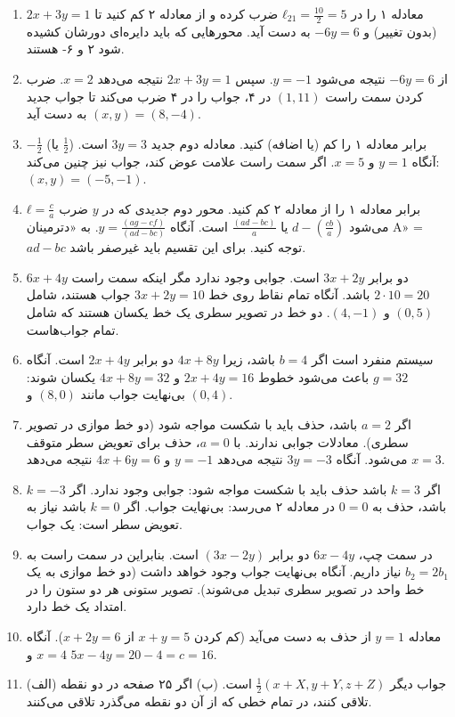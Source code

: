 \documentclass[12pt]{article}
\begin{document}
	
	\begin{enumerate}
		\item معادله ۱ را در $ℓ_{21} = \frac{10}{2} = 5$ ضرب کرده و از معادله ۲ کم کنید تا $2x+3y=1$ (بدون تغییر) و $−6y=6$ به دست آید. محورهایی که باید دایره‌ای دورشان کشیده شود ۲ و ۶- هستند.
		\item از $−6y=6$ نتیجه می‌شود $y=−1$. سپس $2x+3y=1$ نتیجه می‌دهد $x=2$. ضرب کردن سمت راست $(1,11)$ در ۴، جواب را در ۴ ضرب می‌کند تا جواب جدید $(x,y)=(8,−4)$ به دست آید.
		\item $-\frac{1}{2}$ (یا $\frac{1}{2}$) برابر معادله ۱ را کم (یا اضافه) کنید. معادله دوم جدید $3y=3$ است. آنگاه $y=1$ و $x=5$. اگر سمت راست علامت عوض کند، جواب نیز چنین می‌کند: $(x,y)=(−5,−1)$.
		\item $ℓ=\frac{c}{a}$ برابر معادله ۱ را از معادله ۲ کم کنید. محور دوم جدیدی که در $y$ ضرب می‌شود $d−(\frac{cb}{a})$ یا $\frac{(ad−bc)}{a}$ است. آنگاه $y=\frac{(ag−cf)}{(ad−bc)}$. به «دترمینان A» = $ad−bc$ توجه کنید. برای این تقسیم باید غیرصفر باشد.
		\item $6x+4y$ دو برابر $3x+2y$ است. جوابی وجود ندارد مگر اینکه سمت راست $2 \cdot 10 = 20$ باشد. آنگاه تمام نقاط روی خط $3x+2y = 10$ جواب هستند، شامل $(0,5)$ و $(4,−1)$. دو خط در تصویر سطری یک خط یکسان هستند که شامل تمام جواب‌هاست.
		\item سیستم منفرد است اگر $b = 4$ باشد، زیرا $4x + 8y$ دو برابر $2x+4y$ است. آنگاه $g = 32$ باعث می‌شود خطوط $2x+4y=16$ و $4x+8y=32$ یکسان شوند: بی‌نهایت جواب مانند $(8,0)$ و $(0,4)$.
		\item اگر $a = 2$ باشد، حذف باید با شکست مواجه شود (دو خط موازی در تصویر سطری). معادلات جوابی ندارند. با $a = 0$، حذف برای تعویض سطر متوقف می‌شود. آنگاه $3y = −3$ نتیجه می‌دهد $y = −1$ و $4x+6y = 6$ نتیجه می‌دهد $x = 3$.
		\item اگر $k = 3$ باشد حذف باید با شکست مواجه شود: جوابی وجود ندارد. اگر $k = −3$ باشد، حذف به $0 = 0$ در معادله ۲ می‌رسد: بی‌نهایت جواب. اگر $k = 0$ باشد نیاز به تعویض سطر است: یک جواب.
		\item در سمت چپ، $6x−4y$ دو برابر $(3x−2y)$ است. بنابراین در سمت راست به $b_2 = 2b_1$ نیاز داریم. آنگاه بی‌نهایت جواب وجود خواهد داشت (دو خط موازی به یک خط واحد در تصویر سطری تبدیل می‌شوند). تصویر ستونی هر دو ستون را در امتداد یک خط دارد.
		\item معادله $y = 1$ از حذف به دست می‌آید (کم کردن $x+y=5$ از $x+2y=6$). آنگاه $x=4$ و $5x−4y = 20−4=c=16$.
		\item (الف) جواب دیگر $\frac{1}{2}(x+X, y+Y, z+Z)$ است. (ب) اگر ۲۵ صفحه در دو نقطه تلاقی کنند، در تمام خطی که از آن دو نقطه می‌گذرد تلاقی می‌کنند.

\end{enumerate}
\end{document}
